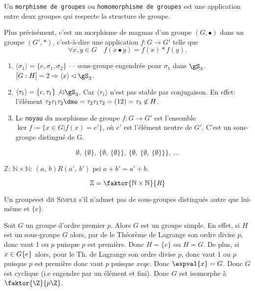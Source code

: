 \begin{rappel}
Un \texttt{morphisme de groupes} ou \texttt{homomorphisme de groupes} est une application entre deux groupes qui respecte la structure de groupe.

Plus précisément, c'est un morphisme de magmas d'un groupe 
$(G,•)$  dans un groupe $(G',\ast)$, c'est-à-dire une application 
$f:G\rightarrow G'$ telle que
$$\forall x,y\in G\quad f(x•y)=f(x)\ast f(y).$$

\end{rappel}

\begin{exercise}
	\begin{enumerate}
		\item $\langle \sigma_1 \rangle=\{e,\sigma_1,\sigma_2\}$ --- sous-groupe engendrée pour $\sigma_1$ dans $\gS_3$. $[G:H]=2\Rightarrow \langle x\rangle\lhd\gS_3$.
		\item $\langle \tau_1\rangle=\{e,\tau_1\} \not\lhd \gS_3$. Car $\langle \tau_1 \rangle$ n'est pas stable par conjugaison. En effet: l'élément $\tau_2\tau_1\tau_2\dmo =\tau_2\tau_1\tau_2=(12)=\tau_3 \not\in H$.
		\item Le \texttt{noyau} du morphisme de groupe $f:G\rightarrow G'$ est l'ensemble $\ker f\coloneq\{x\in G | f(x)=e'\}$, où $e'$ est l'élément neutre de $G'$. C'est un sous-groupe distingué de G.
	\end{enumerate}
\end{exercise}

\ifcomment
$$\emptyset,\ \{\emptyset\},\ \{\emptyset,\ \{\emptyset\}\},\ \{\emptyset,\ \{\emptyset,\ \{\emptyset\}\}\},\ ...$$

$\mathbb{Z}$: $\mathbb{N}\times\mathbb{N}$:
$(a,\ b)R(a',\ b')$ psi $a+b'=a' + b$.

$$\mathbb{Z}=\faktor{\mathbb{N}\times\mathbb{N}}{R}$$
\fi


\begin{definition}
	Un groupeest dit \textsc{Simple} s'il n'admet pas de sous-groupes distingués autre que lui-même et $\{e\}$.
\end{definition}

\begin{exercise}
Soit $G$ un groupe d'ordre premier $p$.
		Alors $G$ est un groupe simple. En effet, si $H$ est un sous-groupe $G$ alors, par de le Théorème de Lagrange son ordre divise $p$, donc vaut 1 ou $p$ puisque $p$ est première. Donc $H=\{e\}$ ou $H=G$. De plus, si $x\in G\\ \{e\}$ alors, pour le Th. de Lagrange son ordre divise $p$, donc vaut 1 ou $p$ puisque $p$ est première donc vaut $p$ puisque $x eq e$. Donc $\expval{x}=G$. Donc $G$ est cyclique (i.e engendre par un élément et fini). Donc $G$ est isomorphe à $\faktor{\Z}{p\Z}$.
\end{exercise}

